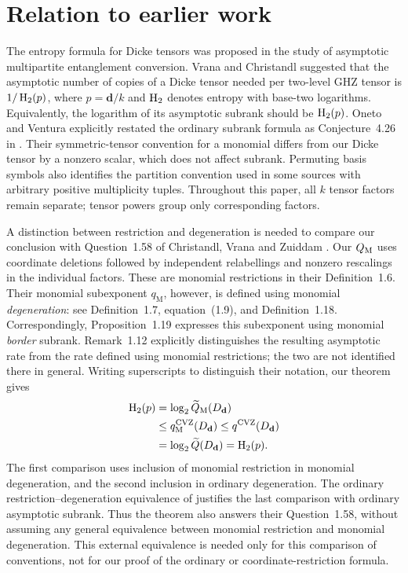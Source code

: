 \section{Relation to earlier work}
\label{sec:history}

The entropy formula for Dicke tensors was proposed in the study of
asymptotic multipartite entanglement conversion. Vrana and Christandl
\cite[Section~VI, equation~(40)]{VC2015} suggested that the asymptotic
number of copies of a Dicke tensor needed per two-level GHZ tensor is
$1/\operatorname{H}_2(p)$, where $p=\mathbf d/k$ and $\operatorname{H}_2$ denotes entropy with
base-two logarithms. Equivalently, the logarithm of its asymptotic subrank
should be $\operatorname{H}_2(p)$. Oneto and Ventura explicitly restated the ordinary
subrank formula as Conjecture~4.26 in \cite{OV2025}. Their symmetric-tensor
convention for a monomial differs from our Dicke tensor by a nonzero
scalar, which does not affect subrank. Permuting basis symbols also
identifies the partition convention used in some sources with arbitrary
positive multiplicity tuples. Throughout this paper, all $k$ tensor
factors remain separate; tensor powers group only corresponding factors.

A distinction between restriction and degeneration is needed to compare
our conclusion with Question~1.58 of Christandl, Vrana and Zuiddam
\cite{CVZ2019}. Our $Q_{\mathrm M}$ uses coordinate deletions followed by
independent relabellings and nonzero rescalings in the individual factors.
These are monomial restrictions in their Definition~1.6. Their monomial
subexponent $q_{\mathrm M}$, however, is defined using monomial
\emph{degeneration}: see Definition~1.7, equation~(1.9), and
Definition~1.18. Correspondingly, Proposition~1.19 expresses this
subexponent using monomial \emph{border} subrank. Remark~1.12 explicitly
distinguishes the resulting asymptotic rate from the rate defined using
monomial restrictions; the two are not identified there in general.
Writing superscripts to distinguish their notation, our theorem gives
\begin{equation}
\label{eq:cvz-convention-comparison}
\begin{aligned}
 \operatorname{H}_2(p)
   &= \log_2 \widetilde Q_{\mathrm M}(D_{\mathbf d}) \\
   &\le q_{\mathrm M}^{\mathrm{CVZ}}(D_{\mathbf d})
    \le q^{\mathrm{CVZ}}(D_{\mathbf d}) \\
   &= \log_2 \widetilde Q(D_{\mathbf d})=\operatorname{H}_2(p).
\end{aligned}
\end{equation}
The first comparison uses inclusion of monomial restriction in monomial
degeneration, and the second inclusion in ordinary degeneration. The
ordinary restriction--degeneration equivalence of
\cite[Theorem~1.11]{CVZ2019} justifies the last comparison with ordinary
asymptotic subrank. Thus the theorem also answers their Question~1.58,
without assuming any general equivalence between monomial restriction
and monomial degeneration. This external equivalence is needed only for
this comparison of conventions, not for our proof of the ordinary or
coordinate-restriction formula.

